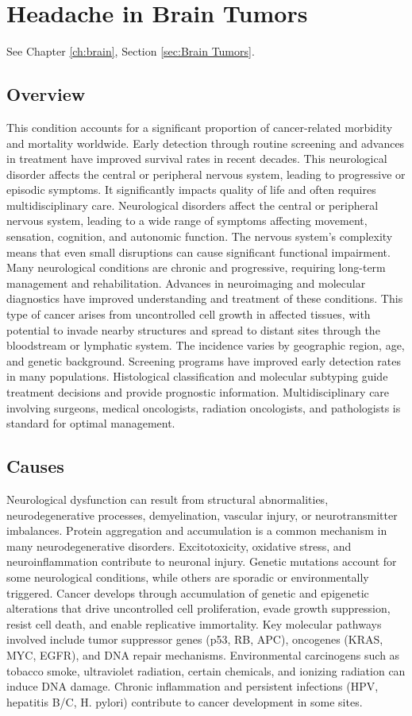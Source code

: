 \chapter{Headache in Brain Tumors}
\label{sec:Headache Brain Tumors}
See Chapter \ref{ch:brain}, Section \ref{sec:Brain Tumors}.

\section{Overview}
This condition accounts for a significant proportion of cancer-related morbidity and mortality worldwide. Early detection through routine screening and advances in treatment have improved survival rates in recent decades. This neurological disorder affects the central or peripheral nervous system, leading to progressive or episodic symptoms. It significantly impacts quality of life and often requires multidisciplinary care. Neurological disorders affect the central or peripheral nervous system, leading to a wide range of symptoms affecting movement, sensation, cognition, and autonomic function. The nervous system's complexity means that even small disruptions can cause significant functional impairment. Many neurological conditions are chronic and progressive, requiring long-term management and rehabilitation. Advances in neuroimaging and molecular diagnostics have improved understanding and treatment of these conditions. This type of cancer arises from uncontrolled cell growth in affected tissues, with potential to invade nearby structures and spread to distant sites through the bloodstream or lymphatic system. The incidence varies by geographic region, age, and genetic background. Screening programs have improved early detection rates in many populations. Histological classification and molecular subtyping guide treatment decisions and provide prognostic information. Multidisciplinary care involving surgeons, medical oncologists, radiation oncologists, and pathologists is standard for optimal management.
\section{Causes}
Neurological dysfunction can result from structural abnormalities, neurodegenerative processes, demyelination, vascular injury, or neurotransmitter imbalances. Protein aggregation and accumulation is a common mechanism in many neurodegenerative disorders. Excitotoxicity, oxidative stress, and neuroinflammation contribute to neuronal injury. Genetic mutations account for some neurological conditions, while others are sporadic or environmentally triggered. Cancer develops through accumulation of genetic and epigenetic alterations that drive uncontrolled cell proliferation, evade growth suppression, resist cell death, and enable replicative immortality. Key molecular pathways involved include tumor suppressor genes (p53, RB, APC), oncogenes (KRAS, MYC, EGFR), and DNA repair mechanisms. Environmental carcinogens such as tobacco smoke, ultraviolet radiation, certain chemicals, and ionizing radiation can induce DNA damage. Chronic inflammation and persistent infections (HPV, hepatitis B/C, H. pylori) contribute to cancer development in some sites.
